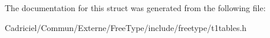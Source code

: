 The documentation for this struct was generated from the following file\+:\begin{DoxyCompactItemize}
\item 
Cadriciel/\+Commun/\+Externe/\+Free\+Type/include/freetype/t1tables.\+h\end{DoxyCompactItemize}

